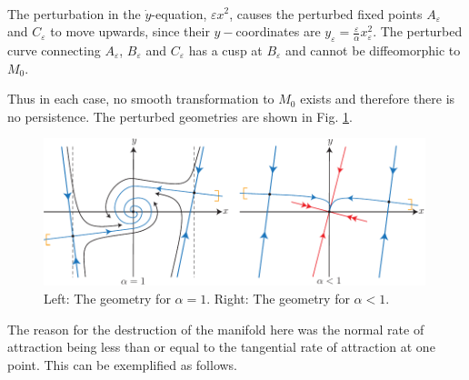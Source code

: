 \begin{ex}[]
\begin{enumerate}
\begin{align}
	\end{align}The perturbation in the $\dot{y}$-equation, $\varepsilon x^2$, causes the perturbed fixed points $A_\varepsilon$ and $C_\varepsilon$ to move upwards, since their $y-$coordinates are $y_\varepsilon  = \frac{\varepsilon}{\alpha}x_\varepsilon^2$. The perturbed curve connecting $A_\varepsilon$, $B_\varepsilon$ and $C_\varepsilon$ has a cusp at $B_\varepsilon$ and cannot be diffeomorphic to $M_0$.
\end{enumerate}
Thus in each case, no smooth transformation to $M_0$ exists and therefore there is no persistence. The perturbed geometries are shown in Fig. \ref{fig:nondiffeo_pertubation}.
\begin{figure}[h!]
	\centering
	\includegraphics[width=0.99\textwidth]{figures/ch9/11_75alpha_perturbation.pdf}
	\caption{Left: The geometry for $\alpha=1$. Right: The geometry for $\alpha<1$.}
	\label{fig:nondiffeo_pertubation}
\end{figure}

\end{ex}

The reason for the destruction of the manifold here was the normal rate of attraction being less than or equal to the tangential rate of attraction at one point. This can be exemplified as follows.


